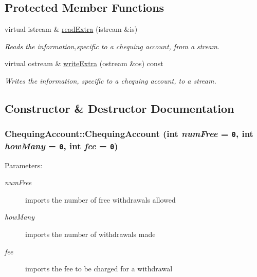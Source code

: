 \subsection*{Protected Member Functions}
\begin{CompactItemize}
\item 
virtual istream \& \hyperlink{classChequingAccount_09de2d9912d5f817b651659404549111}{readExtra} (istream \&is)
\begin{CompactList}\small\item\em Reads the information,specific to a chequing account, from a stream. \item\end{CompactList}\item 
virtual ostream \& \hyperlink{classChequingAccount_5f2831100ca8357b9d74a1402477f3f6}{writeExtra} (ostream \&os) const 
\begin{CompactList}\small\item\em Writes the information, specific to a chequing account, to a stream. \item\end{CompactList}\end{CompactItemize}


\subsection{Constructor \& Destructor Documentation}
\hypertarget{classChequingAccount_abe675fa503c8abfdee3913d35b52197}{
\subsubsection[ChequingAccount]{\setlength{\rightskip}{0pt plus 5cm}ChequingAccount::ChequingAccount (int {\em numFree} = {\tt 0}, \/  int {\em howMany} = {\tt 0}, \/  int {\em fee} = {\tt 0})}}
\label{classChequingAccount_abe675fa503c8abfdee3913d35b52197}


\begin{Desc}
\item[Parameters:]
\begin{description}
\item[{\em numFree}]imports the number of free withdrawals allowed \item[{\em howMany}]imports the number of withdrawals made \item[{\em fee}]imports the fee to be charged for a withdrawal \end{description}
\end{Desc}


